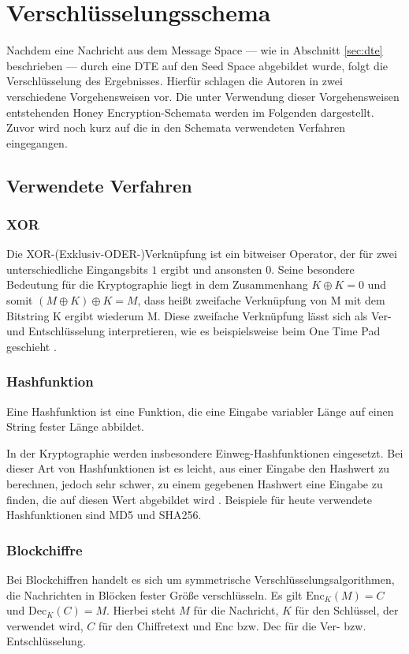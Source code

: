\section{Verschlüsselungsschema}
\label{sec:schema}

Nachdem eine Nachricht aus dem Message Space --- wie in Abschnitt \ref{sec:dte} beschrieben --- durch eine DTE auf den Seed Space abgebildet wurde, folgt die Verschlüsselung des Ergebnisses. Hierfür schlagen die Autoren in \cite{EURO2014} zwei verschiedene Vorgehensweisen vor. Die unter Verwendung dieser Vorgehensweisen entstehenden Honey Encryption-Schemata werden im Folgenden dargestellt. Zuvor wird noch kurz auf die in den Schemata verwendeten Verfahren eingegangen.

\subsection{Verwendete Verfahren}

\subsubsection*{XOR}
Die XOR-(Exklusiv-ODER-)Verknüpfung ist ein bitweiser Operator, der für zwei unterschiedliche Eingangsbits $1$ ergibt und ansonsten $0$. Seine besondere Bedeutung für die Kryptographie liegt in dem Zusammenhang \(K \oplus K = 0\) und somit \((M \oplus K) \oplus K = M\), dass heißt zweifache Verknüpfung von M mit dem Bitstring K ergibt wiederum M. Diese zweifache Verknüpfung lässt sich als Ver- und Entschlüsselung interpretieren, wie es beispielsweise beim One Time Pad geschieht \cite{Schneier2006}.%

\subsubsection*{Hashfunktion}
Eine Hashfunktion ist eine Funktion, die eine Eingabe variabler Länge auf einen String fester Länge abbildet.

In der Kryptographie werden insbesondere Einweg-Hashfunktionen eingesetzt. Bei dieser Art von Hashfunktionen ist es leicht, aus einer Eingabe den Hashwert zu berechnen, jedoch sehr schwer, zu einem gegebenen Hashwert eine Eingabe zu finden, die auf diesen Wert abgebildet wird \cite{Schneier2006}. Beispiele für heute verwendete Hashfunktionen sind MD5 und SHA256.

\subsubsection*{Blockchiffre}
Bei Blockchiffren handelt es sich um symmetrische Verschlüsselungsalgorithmen, die Nachrichten in Blöcken fester Größe verschlüsseln. Es gilt \(\text{Enc}_K(M)=C\) und \(\text{Dec}_K(C)=M\). Hierbei steht \(M\) für die Nachricht, \(K\) für den Schlüssel, der verwendet wird, \(C\) für den Chiffretext und Enc bzw. Dec für die Ver- bzw. Entschlüsselung\cite{Schneier2006}.

